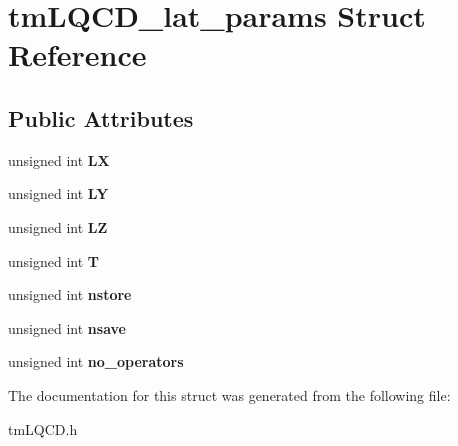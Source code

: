 \hypertarget{structtmLQCD__lat__params}{\section{tm\-L\-Q\-C\-D\-\_\-lat\-\_\-params Struct Reference}
\label{structtmLQCD__lat__params}
}
\subsection*{Public Attributes}
\begin{DoxyCompactItemize}
\item 
\hypertarget{structtmLQCD__lat__params_ac604fb33ac7c6adbce19e4528227ed45}{unsigned int {\bfseries L\-X}}\label{structtmLQCD__lat__params_ac604fb33ac7c6adbce19e4528227ed45}

\item 
\hypertarget{structtmLQCD__lat__params_ae772aab605aba0fc937408590cbad30f}{unsigned int {\bfseries L\-Y}}\label{structtmLQCD__lat__params_ae772aab605aba0fc937408590cbad30f}

\item 
\hypertarget{structtmLQCD__lat__params_aeb5939ae814a462cbcd29c798cfec945}{unsigned int {\bfseries L\-Z}}\label{structtmLQCD__lat__params_aeb5939ae814a462cbcd29c798cfec945}

\item 
\hypertarget{structtmLQCD__lat__params_a8806fb05bcfc74017242bf7849539cb5}{unsigned int {\bfseries T}}\label{structtmLQCD__lat__params_a8806fb05bcfc74017242bf7849539cb5}

\item 
\hypertarget{structtmLQCD__lat__params_a7ac83ddf487a69c40a921d94f7fad408}{unsigned int {\bfseries nstore}}\label{structtmLQCD__lat__params_a7ac83ddf487a69c40a921d94f7fad408}

\item 
\hypertarget{structtmLQCD__lat__params_a1934742e3d3a1accee6c7f21c63bd789}{unsigned int {\bfseries nsave}}\label{structtmLQCD__lat__params_a1934742e3d3a1accee6c7f21c63bd789}

\item 
\hypertarget{structtmLQCD__lat__params_a780273ecf2e9ba4e053ea9bb490cb673}{unsigned int {\bfseries no\-\_\-operators}}\label{structtmLQCD__lat__params_a780273ecf2e9ba4e053ea9bb490cb673}

\end{DoxyCompactItemize}


The documentation for this struct was generated from the following file\-:\begin{DoxyCompactItemize}
\item 
tm\-L\-Q\-C\-D.\-h\end{DoxyCompactItemize}
